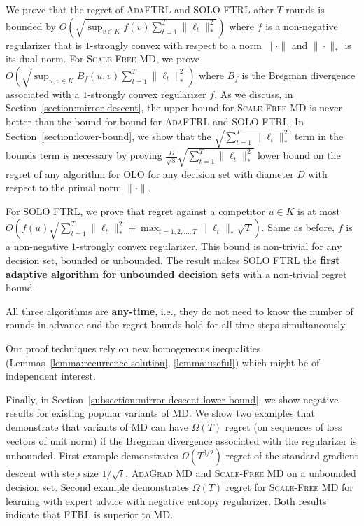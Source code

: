 We prove that the regret of \textsc{AdaFTRL} and \textsc{SOLO FTRL} after $T$
rounds is bounded by $O \left(\sqrt{\sup_{v \in K} f(v)
\sum_{t=1}^T\|\ell_t\|_*^2} \right)$ where $f$ is a non-negative regularizer
that is $1$-strongly convex with respect to a norm $\|\cdot\|$ and
$\|\cdot\|_*$ is its dual norm. For \textsc{Scale-Free MD}, we prove $O
\left(\sqrt{\sup_{u,v \in K} B_f(u,v) \sum_{t=1}^T\|\ell_t\|_*^2} \right)$
where $B_f$ is the Bregman divergence associated with a $1$-strongly convex
regularizer $f$.  As we discuss, in Section~\ref{section:mirror-descent}, the
upper bound for \textsc{Scale-Free MD} is never better than the bound for bound
for \textsc{AdaFTRL} and \textsc{SOLO FTRL}.  In
Section~\ref{section:lower-bound}, we show that the $\sqrt{\sum_{t=1}^T
\|\ell_t\|_*^2}$ term in the bounds term is necessary by proving
$\frac{D}{\sqrt{8}} \sqrt{\sum_{t=1}^T\|\ell_t\|_*^2}$ lower bound on the
regret of any algorithm for OLO for any decision set with diameter $D$ with
respect to the primal norm $\|\cdot\|$.

For \textsc{SOLO FTRL}, we prove that regret against a competitor $u \in K$ is
at most $O \left(f(u) \sqrt{\sum_{t=1}^T \|\ell_t\|_*^2} + \max_{t=1,2,\dots,T}
\|\ell_t\|_* \sqrt{T} \right)$.  Same as before, $f$ is a non-negative
$1$-strongly convex regularizer. This bound is non-trivial for any decision
set, bounded or unbounded.  The result makes \textsc{SOLO FTRL} the
\textbf{first adaptive algorithm for unbounded decision sets} with a
non-trivial regret bound.

All three algorithms are \textbf{any-time}, i.e., they do not need to know the
number of rounds in advance and the regret bounds hold for all time steps
simultaneously.

Our proof techniques rely on new homogeneous
inequalities (Lemmas~\ref{lemma:recurrence-solution}, \ref{lemma:useful})
which might be of independent interest.

Finally, in Section~\ref{subsection:mirror-descent-lower-bound}, we show
negative results for existing popular variants of \textsc{MD}. We show two
examples that demonstrate that variants of \textsc{MD} can have $\Omega(T)$
regret (on sequences of loss vectors of unit norm) if the Bregman divergence
associated with the regularizer is unbounded.  First example demonstrates
$\Omega(T^{3/2})$ regret of the standard gradient descent with step size
$1/\sqrt{t}$, \textsc{AdaGrad MD} and \textsc{Scale-Free MD} on a unbounded
decision set.  Second example demonstrates $\Omega(T)$ regret for
\textsc{Scale-Free MD} for learning with expert advice with negative entropy
regularizer.  Both results indicate that \textsc{FTRL} is superior to
\textsc{MD}.
